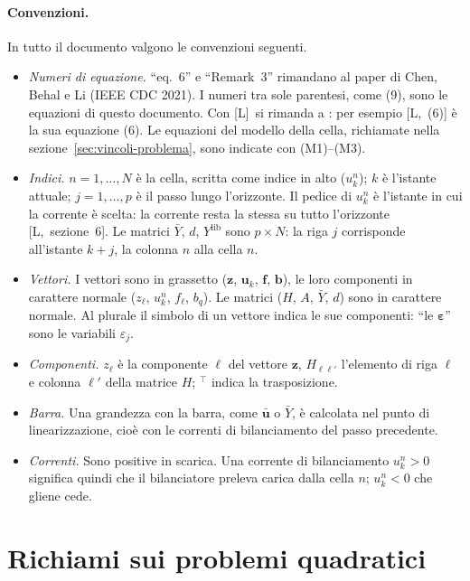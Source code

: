 \documentclass[11pt,a4paper]{article}
\newcommand{\file}[1]{\texttt{\detokenize{#1}}}
\newcommand{\rif}{[L]}                      %
\newcommand{\vett}[1]{\boldsymbol{#1}}      %
\newcommand{\lib}{\mathrm{lib}}             %
\begin{document}
\paragraph{Convenzioni.} In tutto il documento valgono le convenzioni
seguenti.
\begin{itemize}
  \item \emph{Numeri di equazione.} ``eq.~6'' e ``Remark~3'' rimandano al
        paper di Chen, Behal e Li (IEEE CDC 2021). I numeri tra sole
        parentesi, come (9), sono le equazioni di questo documento. Con
        \rif\ si rimanda a \file{Linearizzazione_MPC.pdf}: per esempio
        [L,~(6)] è la sua equazione (6). Le equazioni del modello della
        cella, richiamate nella sezione~\ref{sec:vincoli-problema}, sono
        indicate con (M1)--(M3).
  \item \emph{Indici.} $n = 1,\dots,N$ è la cella, scritta come indice in
        alto ($u^n_k$); $k$ è l'istante attuale; $j = 1,\dots,p$ è il passo lungo
        l'orizzonte. Il pedice di $u^n_k$ è l'istante in cui la corrente è
        scelta: la corrente resta la stessa su tutto l'orizzonte [L,~sezione~6].
        Le matrici $\bar Y$, $d$, $Y^\lib$ sono $p \times N$: la riga
        $j$ corrisponde all'istante $k+j$, la colonna $n$ alla cella $n$.
  \item \emph{Vettori.} I vettori sono in grassetto ($\vett{z}$, $\vett{u}_k$,
        $\vett{f}$, $\vett{b}$), le loro componenti in carattere normale
        ($z_\ell$, $u^n_k$, $f_\ell$, $b_q$). Le matrici ($H$, $A$, $\bar Y$,
        $d$) sono in carattere normale. Al plurale il simbolo di un vettore
        indica le sue componenti: ``le $\vett{\varepsilon}$'' sono le
        variabili $\varepsilon_j$.
  \item \emph{Componenti.} $z_\ell$ è la componente $\ell$ del vettore $\vett{z}$,
        $H_{\ell\ell'}$ l'elemento di riga $\ell$ e colonna $\ell'$ della
        matrice $H$; ${}^\top$ indica la trasposizione.
  \item \emph{Barra.} Una grandezza con la barra, come $\bar{\vett{u}}$ o $\bar Y$, è
        calcolata nel punto di linearizzazione, cioè con le correnti di
        bilanciamento del passo precedente.
  \item \emph{Correnti.} Sono positive in scarica. Una corrente di
        bilanciamento $u^n_k > 0$ significa quindi che il bilanciatore preleva
        carica dalla cella $n$; $u^n_k < 0$ che gliene cede.
\end{itemize}

\section{Richiami sui problemi quadratici}\label{sec:richiami}
\end{document}
